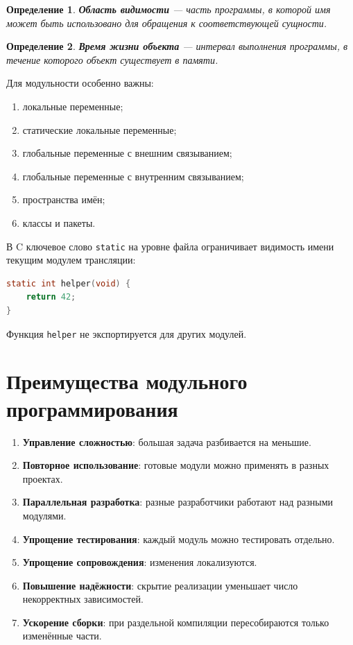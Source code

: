 \documentclass[12pt,a4paper]{article}
\newtheorem{definition}{Определение}
\begin{document}
\begin{definition}
\textbf{Область видимости} --- часть программы, в которой имя может быть использовано для обращения к соответствующей сущности.
\end{definition}

\begin{definition}
\textbf{Время жизни объекта} --- интервал выполнения программы, в течение которого объект существует в памяти.
\end{definition}

Для модульности особенно важны:
\begin{enumerate}
  \item локальные переменные;
  \item статические локальные переменные;
  \item глобальные переменные с внешним связыванием;
  \item глобальные переменные с внутренним связыванием;
  \item пространства имён;
  \item классы и пакеты.
\end{enumerate}

В C ключевое слово \texttt{static} на уровне файла ограничивает видимость имени текущим модулем трансляции:

\begin{lstlisting}[language=C]
static int helper(void) {
    return 42;
}
\end{lstlisting}

Функция \texttt{helper} не экспортируется для других модулей.

\section{Преимущества модульного программирования}

\begin{enumerate}
  \item \textbf{Управление сложностью}: большая задача разбивается на меньшие.
  \item \textbf{Повторное использование}: готовые модули можно применять в разных проектах.
  \item \textbf{Параллельная разработка}: разные разработчики работают над разными модулями.
  \item \textbf{Упрощение тестирования}: каждый модуль можно тестировать отдельно.
  \item \textbf{Упрощение сопровождения}: изменения локализуются.
  \item \textbf{Повышение надёжности}: скрытие реализации уменьшает число некорректных зависимостей.
  \item \textbf{Ускорение сборки}: при раздельной компиляции пересобираются только изменённые части.
\end{enumerate}
\end{document}
